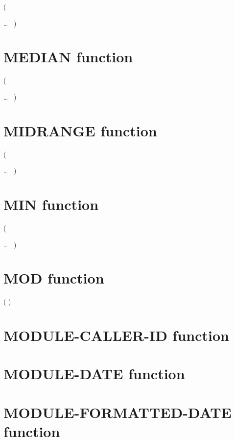   (
\begin{1=}
  \argument
\end{1=}\ldots
\ {})

\section{MEDIAN function}

  (
\begin{1=}
  \argument
\end{1=}\ldots
\ {})

\section{MIDRANGE function}

  (
\begin{1=}
  \argument
\end{1=}\ldots
\ {})

\section{MIN function}

  (
\begin{1=}
  \argument
\end{1=}\ldots
\ {})

\section{MOD function}

  ( \argument \argument )

\section{MODULE-CALLER-ID function}


\section{MODULE-DATE function}


\section{MODULE-FORMATTED-DATE function}

